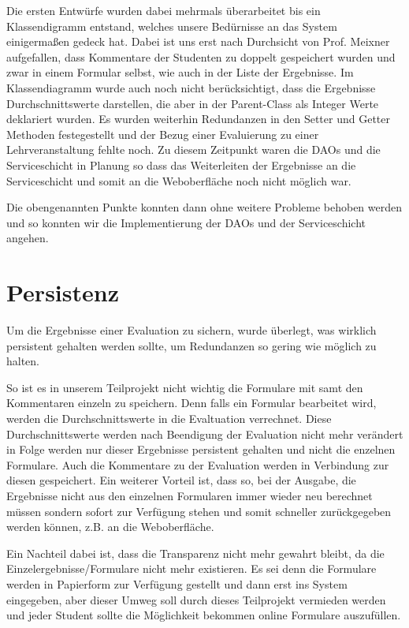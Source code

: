 \documentclass[titlepage, 12pt,a4paper]{scrartcl}
\begin{document}
Die ersten Entwürfe wurden dabei mehrmals überarbeitet bis ein Klassendigramm
entstand, welches unsere Bedürnisse an das System einigermaßen gedeck hat.
Dabei ist uns erst nach Durchsicht von Prof. Meixner aufgefallen, dass
Kommentare der Studenten zu doppelt gespeichert wurden und zwar in einem
Formular selbst, wie auch in der Liste der Ergebnisse. Im
Klassendiagramm wurde auch noch nicht berücksichtigt, dass die Ergebnisse
Durchschnittswerte darstellen, die aber in der Parent-Class als Integer Werte
deklariert wurden. Es wurden weiterhin Redundanzen in den Setter und Getter
Methoden festegestellt und der Bezug einer Evaluierung zu einer
Lehrveranstaltung fehlte noch. Zu diesem Zeitpunkt waren die DAOs und die
Serviceschicht in Planung so dass das Weiterleiten der Ergebnisse an die
Serviceschicht und somit an die Weboberfläche noch nicht möglich war. 

Die obengenannten Punkte konnten dann ohne weitere Probleme behoben werden und
so konnten wir die Implementierung der DAOs und der Serviceschicht angehen. 

\section{Persistenz}
Um die Ergebnisse einer Evaluation zu sichern, wurde überlegt, was wirklich
persistent gehalten werden sollte, um Redundanzen so gering wie möglich zu
halten.

So ist es in unserem Teilprojekt nicht wichtig die Formulare mit samt den
Kommentaren einzeln zu speichern. Denn falls ein Formular bearbeitet wird,
werden die Durchschnittswerte in die Evaltuation verrechnet. Diese
Durchschnittswerte werden nach Beendigung der Evaluation nicht mehr verändert in
Folge werden nur dieser Ergebnisse persistent gehalten und nicht die enzelnen
Formulare. Auch die Kommentare zu der Evaluation werden in Verbindung zur
diesen gespeichert. Ein weiterer Vorteil ist, dass so, bei der Ausgabe,
die Ergebnisse nicht aus den einzelnen Formularen immer wieder neu berechnet
müssen sondern sofort zur Verfügung stehen und somit schneller zurückgegeben
werden können, z.B. an die Weboberfläche.

Ein Nachteil dabei ist, dass die Transparenz nicht mehr gewahrt bleibt, da die
Einzelergebnisse/Formulare nicht mehr existieren. Es sei denn die Formulare
werden in Papierform zur Verfügung gestellt und dann erst ins System
eingegeben, aber dieser Umweg soll durch dieses Teilprojekt vermieden werden
und jeder Student sollte die Möglichkeit bekommen online Formulare auszufüllen.
\end{document}
